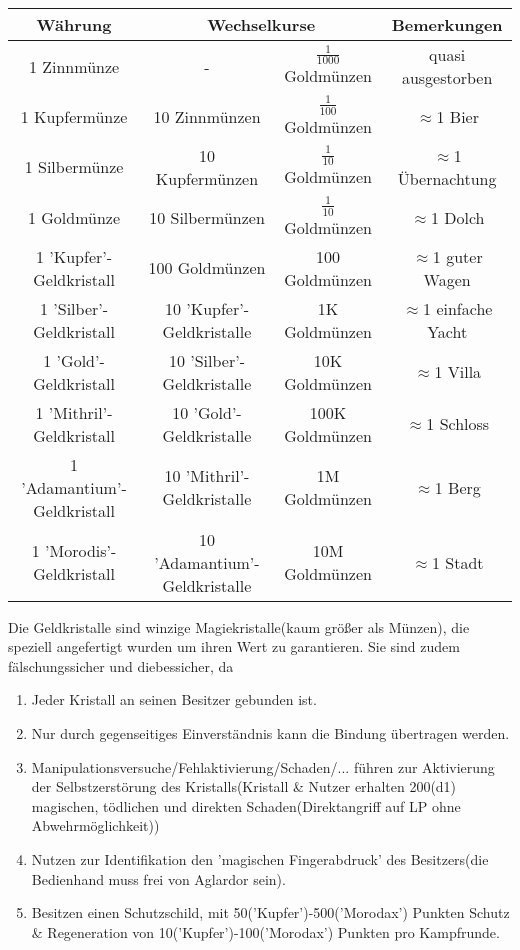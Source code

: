 \begin{tabular}{|c||c|c|c|}
\hline
Währung & \multicolumn{2}{c|}{ Wechselkurse } & Bemerkungen\\
\hline
\hline
1 Zinnmünze & - & $\frac{1}{1000}$ Goldmünzen & quasi ausgestorben\\
\hline
1 Kupfermünze & 10 Zinnmünzen & $\frac{1}{100}$ Goldmünzen & $\approx$1 Bier\\
\hline
1 Silbermünze & 10 Kupfermünzen & $\frac{1}{10}$ Goldmünzen & $\approx$1 Übernachtung\\
\hline
1 Goldmünze & 10 Silbermünzen & $\frac{1}{10}$ Goldmünzen & $\approx$1 Dolch\\
\hline
1 'Kupfer'-Geldkristall & 100 Goldmünzen & 100 Goldmünzen & $\approx$1 guter Wagen\\
\hline
1 'Silber'-Geldkristall & 10 'Kupfer'-Geldkristalle & 1K Goldmünzen & $\approx$1 einfache Yacht\\
\hline
1 'Gold'-Geldkristall & 10 'Silber'-Geldkristalle & 10K Goldmünzen & $\approx$1 Villa\\
\hline
1 'Mithril'-Geldkristall & 10 'Gold'-Geldkristalle & 100K Goldmünzen & $\approx$1 Schloss\\
\hline
1 'Adamantium'-Geldkristall & 10 'Mithril'-Geldkristalle & 1M Goldmünzen & $\approx$1 Berg\\
\hline
1 'Morodis'-Geldkristall & 10 'Adamantium'-Geldkristalle & 10M Goldmünzen & $\approx$1 Stadt\\
\hline
\end{tabular}
Die Geldkristalle sind winzige Magiekristalle(kaum größer als Münzen), die speziell angefertigt wurden um ihren Wert zu garantieren. Sie sind zudem fälschungssicher und diebessicher, da \begin{enumerate}
\item Jeder Kristall an seinen Besitzer gebunden ist.
\item Nur durch gegenseitiges Einverständnis kann die Bindung übertragen werden.
\item Manipulationsversuche/Fehlaktivierung/Schaden/... führen zur Aktivierung der Selbstzerstörung des Kristalls(Kristall \& Nutzer erhalten 200(d1) magischen, tödlichen und direkten Schaden(Direktangriff auf LP ohne Abwehrmöglichkeit))
\item Nutzen zur Identifikation den 'magischen Fingerabdruck' des Besitzers(die Bedienhand muss frei von Aglardor sein).
\item Besitzen einen Schutzschild, mit 50('Kupfer')-500('Morodax') Punkten Schutz \& Regeneration von 10('Kupfer')-100('Morodax') Punkten pro Kampfrunde.
\end{enumerate}


